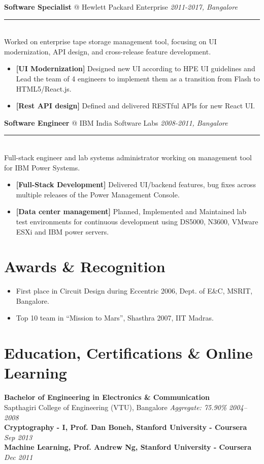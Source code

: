 \documentclass[11pt]{article}
\makeatletter
\newcommand{\roleheader}[3]{%
  {\large\sffamily\textbf{#1} @ #2} \hfill \textit{#3}\\[-0.3em]
  \color{myblue}\rule{\linewidth}{1pt}\\[0.5em]\color{bodytext}
}
\newenvironment{experiencebullets}{%
  \begin{itemize}[leftmargin=1.25em, itemsep=-0.25em]
    \renewcommand{\labelitemi}{\textbullet}
}{%
  \end{itemize}
}
\newenvironment{experience}[4]{%
  \roleheader{#1}{#2}{#3}%
  #4\vspace{0.5em}%
}{%
  \vspace{1em}
}
\makeatother
\begin{document}
\begin{experience}{Software Specialist}{Hewlett Packard Enterprise}{2011-2017, Bangalore}{Worked on enterprise tape storage management tool, focusing on UI modernization, API design, and cross-release feature development.}
  \begin{experiencebullets}
    \item \textbf{[UI Modernization]} Designed new UI according to HPE UI guidelines and Lead the team of 4 engineers to implement them as a transition from Flash to HTML5/React.js.
    \item \textbf{[Rest API design]} Defined and delivered RESTful APIs for new React UI.
  \end{experiencebullets}
\end{experience}

\begin{experience}{Software Engineer}{IBM India Software Labs}{2008-2011, Bangalore}{Full-stack engineer and lab systems administrator working on management tool for IBM Power Systems.}
  \begin{experiencebullets}
    \item \textbf{[Full-Stack Development]} Delivered UI/backend features, bug fixes across multiple releases of the Power Management Console.
    \item \textbf{[Data center management]} Planned, Implemented and Maintained lab test environments for continuous development using DS5000, N3600, VMware ESXi and IBM power servers.
  \end{experiencebullets}
\end{experience}

\section*{Awards \& Recognition}
\begin{itemize}[leftmargin=*, itemsep=0em]
  \item First place in Circuit Design during Eccentric 2006, Dept. of E\&C, MSRIT, Bangalore.
  \item Top 10 team in “Mission to Mars”, Shasthra 2007, IIT Madras.
\end{itemize}


\section*{Education, Certifications \& Online Learning}

\textbf{Bachelor of Engineering in Electronics \& Communication} \\
Sapthagiri College of Engineering (VTU), Bangalore \hfill \textit{Aggregate: 75.90\%} \textit{2004–2008}  \\

\vspace{0.5em}
\textbf{Cryptography - I, Prof. Dan Boneh, Stanford University - Coursera} \hfill \textit{Sep 2013} \\

\textbf{Machine Learning, Prof. Andrew Ng, Stanford University - Coursera} \hfill \textit{Dec 2011} \\
\end{document}

